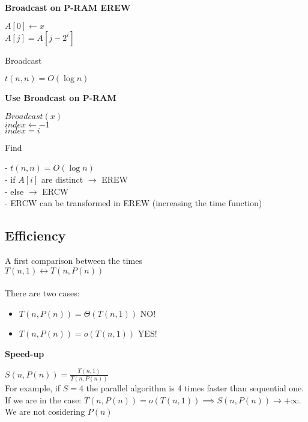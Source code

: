\textbf{Broadcast on P-RAM EREW}

\begin{algorithm}[H]
 \SetAlgoLined
 $A[0] \gets x$\\
  {
   { 
   $A[j] = A[j-2^{i}]$ 
  }
 } 
 \caption{Broadcast}
\end{algorithm}

$t(n, n) = O(\log{n})$

\textbf{Use Broadcast on P-RAM}

\begin{algorithm}[H]
 \SetAlgoLined
 \KwResult{}
 $Broadcast(x)$\\
 $index \gets -1$\\
  {
   { 
   $index = i$ 
  }
 } 
 \caption{Find}
\end{algorithm}

- $t(n, n) = O(\log{n})$\\
- if $A[i]$ are distinct $\rightarrow$ EREW\\
- else $\rightarrow$ ERCW\\
- ERCW can be transformed in EREW (increasing the time function)

\subsection{Efficiency}

A first comparison between the times\\
$T(n,1) 	\leftrightarrow T(n, P(n))$\\ \\
There are two cases:
\begin{itemize}
 \item $T(n, P(n)) = \Theta(T(n,1))$ NO!
 \item $T(n, P(n)) = o(T(n,1))$ YES!
\end{itemize}

\textbf{Speed-up}

$S(n, P(n)) = \frac{T(n,1)}{T(n, P(n))}$\\
For example, if $S = 4$ the parallel algorithm is 4 times faster than sequential one.\\
If we are in the case: $T(n, P(n)) = o(T(n,1)) \implies S(n, P(n)) \rightarrow +\infty$. We are not cosidering $P(n)$\\

